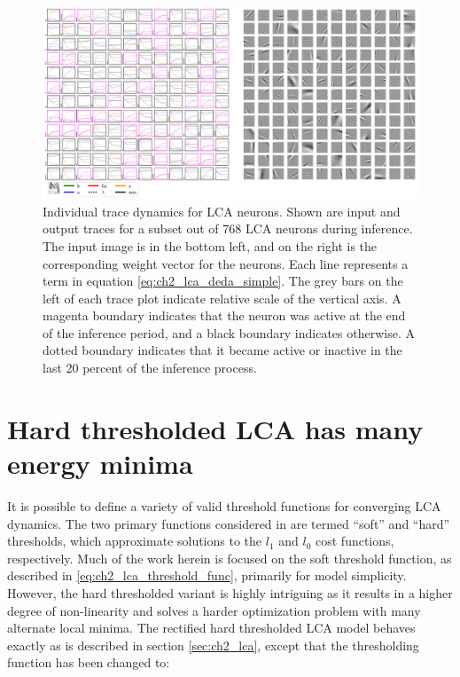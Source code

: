 \begin{figure}\label{fig:ch2_lca_inference_traces}
    \centering
    \includegraphics[width=\textwidth]{figures/lca_inference_traces.png}
    \caption{Individual trace dynamics for LCA neurons. Shown are input and output traces for a subset out of 768 LCA neurons during inference. The input image is in the bottom left, and on the right is the corresponding weight vector for the neurons. Each line represents a term in equation \ref{eq:ch2_lca_deda_simple}. The grey bars on the left of each trace plot indicate relative scale of the vertical axis. A magenta boundary indicates that the neuron was active at the end of the inference period, and a black boundary indicates otherwise. A dotted boundary indicates that it became active or inactive in the last 20 percent of the inference process.}
\end{figure}


\section{Hard thresholded LCA has many energy minima}
It is possible to define a variety of valid threshold functions for converging LCA dynamics. The two primary functions considered in \parencite{rozell2008sparse} are termed ``soft'' and ``hard'' thresholds, which approximate solutions to the $l_{1}$ and $l_{0}$ cost functions, respectively. Much of the work herein is focused on the soft threshold function, as described in \ref{eq:ch2_lca_threshold_func}, primarily for model simplicity. However, the hard thresholded variant is highly intriguing as it results in a higher degree of non-linearity and solves a harder optimization problem with many alternate local minima. The rectified hard thresholded LCA model behaves exactly as is described in section \ref{sec:ch2_lca}, except that the thresholding function has been changed to:

